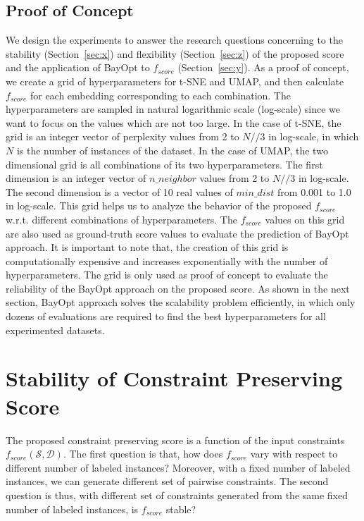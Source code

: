 \subsection{Proof of Concept}
We design the experiments to answer the research questions concerning to the stability (Section~\ref{sec:x}) and flexibility (Section~\ref{sec:z}) of the proposed score and the application of BayOpt to $f_{score}$ (Section~\ref{sec:y}).
As a proof of concept, we create a grid of hyperparameters for t-SNE and UMAP, and then calculate $f_{score}$ for each embedding corresponding to each combination.
The hyperparameters are sampled in natural logarithmic scale (log-scale) since we want to focus on the values which are not too large.
In the case of t-SNE, the grid is an integer vector of perplexity values from 2 to $N // 3$ in log-scale, in which $N$ is the number of instances of the dataset.
In the case of UMAP, the two dimensional grid is all combinations of its two hyperparameters.
The first dimension is an integer vector of $n\_neighbor$ values from 2 to $N // 3$ in log-scale.
The second dimension is a vector of 10 real values of $min\_dist$ from 0.001 to 1.0 in log-scale.
This grid helps us to analyze the behavior of the proposed $f_{score}$ w.r.t. different combinations of hyperparameters.
The $f_{score}$ values on this grid are also used as ground-truth score values to evaluate the prediction of BayOpt approach.
It is important to note that, the creation of this grid is computationally expensive and increases exponentially with the number of hyperparameters.
The grid is only used as proof of concept to evaluate the reliability of the BayOpt approach on the proposed score.
As shown in the next section, BayOpt approach solves the scalability problem efficiently, in which only dozens of evaluations are required to find the best hyperparameters for all experimented datasets.


\section{Stability of Constraint Preserving Score}
The proposed constraint preserving score is a function of the input constraints $f_{score}(\mathcal{S}, \mathcal{D})$.
The first question is that, how does $f_{score}$ vary with respect to different number of labeled instances?
Moreover, with a fixed number of labeled instances, we can generate different set of pairwise constraints.
The second question is thus, with different set of constraints generated from the same fixed number of labeled instances, is $f_{score}$ stable?

